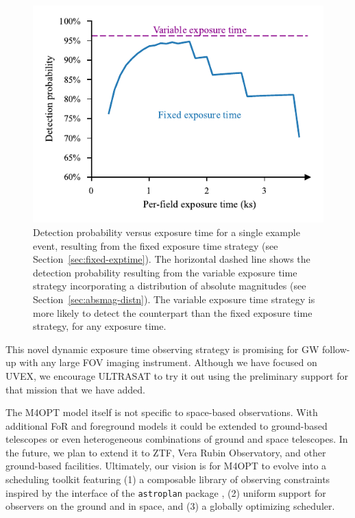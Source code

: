 \documentclass[twocolumn,times]{aastex631}
\begin{document}
\begin{figure}
    \includegraphics[width=\columnwidth]{figures/prob-exptime}
    \caption{\label{fig:prob-exptime}Detection probability versus exposure time for a single example event, resulting from the fixed exposure time strategy (see Section~\ref{sec:fixed-exptime}). The horizontal dashed line shows the detection probability resulting from the variable exposure time strategy incorporating a distribution of absolute magnitudes (see Section~\ref{sec:absmag-distn}). The variable exposure time strategy is more likely to detect the counterpart than the fixed exposure time strategy, for any exposure time.}
\end{figure}

This novel dynamic exposure time observing strategy is promising for \ac{GW} follow-up with any large \ac{FOV} imaging instrument. Although we have focused on \ac{UVEX}, we encourage ULTRASAT to try it out using the preliminary support for that mission that we have added.

The \ac{M4OPT} model itself is not specific to space-based observations. With additional \ac{FoR} and foreground models it could be extended to ground-based telescopes or even heterogeneous combinations of ground and space telescopes. In the future, we plan to extend it to \ac{ZTF}, Vera Rubin Observatory, and other ground-based facilities. Ultimately, our vision is for \ac{M4OPT} to evolve into a scheduling toolkit featuring (1) a composable library of observing constraints inspired by the interface of the \texttt{astroplan} package \citep{2018AJ....155..128M}, (2) uniform support for observers on the ground and in space, and (3) a globally optimizing scheduler.
\end{document}
